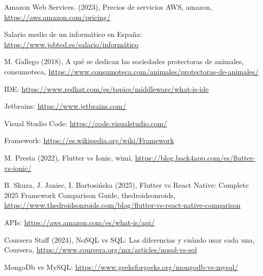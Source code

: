 \newpage
{}
{}
\begin{thebibliography}{9}

\raggedright %

 Amazon Web Services. (2023), Precios de servicios AWS, amazon, \href{https://aws.amazon.com/pricing/}{https://aws.amazon.com/pricing/}

 Salario medio de un informático en España: \href{https://www.jobted.es/salario/inform%C3%A1tico}{https://www.jobted.es/salario/informático}

 M. Gallego (2018), A qué se dedican las sociedades protectoras de animales, consumoteca,  \href{https://www.consumoteca.com/animales/protectoras-de-animales/}{https://www.consumoteca.com/animales/protectoras-de-animales/}

IDE: \href{https://www.redhat.com/es/topics/middleware/what-is-ide}{https://www.redhat.com/es/topics/middleware/what-is-ide}

Jetbrains: \href{https://www.jetbrains.com/}{https://www.jetbrains.com/}

Visual Studio Code: \href{https://code.visualstudio.com/}{https://code.visualstudio.com/}

Framework: \href{https://es.wikipedia.org/wiki/Framework}{https://es.wikipedia.org/wiki/Framework}

 M. Presta (2022), Flutter vs Ionic, wimi,  \href{https://blog.back4app.com/es/flutter-vs-ionic/}{https://blog.back4app.com/es/flutter-vs-ionic/}

B. Skuza, J. Janiec, I. Bartosińska (2025), Flutter vs React Native: Complete 2025 Framework Comparison Guide, thedroidsonroids, \href{https://www.thedroidsonroids.com/blog/flutter-vs-react-native-comparison}{https://www.thedroidsonroids.com/blog/flutter-vs-react-native-comparison}

APIs: \href{https://aws.amazon.com/es/what-is/api/}{https://aws.amazon.com/es/what-is/api/}

 Coursera Staff (2024), NoSQL vs SQL: Las diferencias y cuándo usar cada una, Coursera,  \href{https://www.coursera.org/mx/articles/nosql-vs-sql}{https://www.coursera.org/mx/articles/nosql-vs-sql}

MongoDb vs MySQL: \href{https://www.geeksforgeeks.org/mongodb-vs-mysql/}{https://www.geeksforgeeks.org/mongodb-vs-mysql/}


\end{thebibliography}
